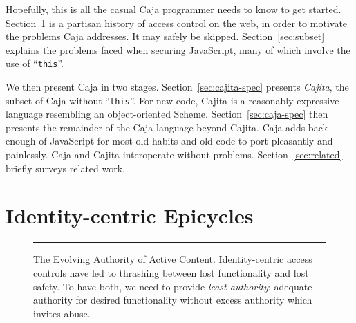 \documentclass[letterpaper,twocolumn,10pt]{article}
\newcommand{\code}[1]{{\tt {#1}}}              %
\begin{document}
Hopefully, this is all the casual Caja programmer needs to know to get 
started. Section~\ref{sec:epicycles} is a partisan history of access control 
on the web, in order to motivate the problems Caja addresses. It may safely 
be skipped. Section~\ref{sec:subset} explains the problems faced when 
securing JavaScript, many of which involve the use of ``\code{this}''.

We then present Caja in two stages. Section~\ref{sec:cajita-spec} presents 
\emph{Cajita}, the subset of Caja without ``\code{this}''. For new code, 
Cajita is a reasonably expressive language resembling an object-oriented 
Scheme. Section~\ref{sec:caja-spec} then presents the remainder of the Caja 
language beyond Cajita. Caja adds back enough of JavaScript for most old 
habits and old code to port pleasantly and painlessly. Caja and Cajita 
interoperate without problems. Section~\ref{sec:related} briefly 
surveys related work.



\section{Identity-centric Epicycles}
\label{sec:epicycles}


\begin{figure}[t!]
  
\caption[The Evolving Authority of Active Content]{The Evolving Authority of 
Active Content. Identity-centric access controls have led to thrashing 
between lost functionality and lost safety. To have both, we need to provide 
\emph{least authority}: adequate authority for desired functionality without 
excess authority which invites abuse. \\ } \hrule
  \label{fig:evo-auth}
\end{figure}
\end{document}
